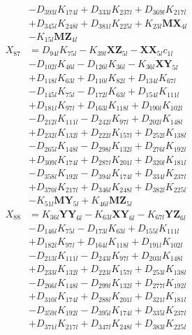 \begin{multicols}{2}
\begin{align}
&- D_{393l}K_{174l} + D_{333l}K_{237l} + D_{369l}K_{217l}  \nonumber \\
&+ D_{345l}K_{248l} + D_{381l}K_{225l} + K_{23l}\mathbf{MX}_{4l}  \nonumber \\
&- K_{15l}\mathbf{MZ}_{4l} \nonumber \\
X_{87} &= D_{94l}K_{75l} - K_{39l}\mathbf{XZ}_{5l} - \mathbf{XX}_{5l}c_{1l}  \nonumber \\
&- D_{102l}K_{46l} - D_{126l}K_{36l} - K_{36l}\mathbf{XY}_{5l}  \nonumber \\
&+ D_{118l}K_{63l} + D_{110l}K_{82l} + D_{134l}K_{67l}  \nonumber \\
&- D_{145l}K_{75l} - D_{172l}K_{63l} + D_{154l}K_{111l}  \nonumber \\
&+ D_{181l}K_{97l} + D_{163l}K_{118l} + D_{190l}K_{102l}  \nonumber \\
&- D_{212l}K_{111l} - D_{242l}K_{97l} + D_{202l}K_{148l}  \nonumber \\
&+ D_{232l}K_{132l} + D_{222l}K_{157l} + D_{252l}K_{138l}  \nonumber \\
&- D_{265l}K_{148l} - D_{298l}K_{132l} + D_{276l}K_{192l}  \nonumber \\
&+ D_{309l}K_{174l} + D_{287l}K_{201l} + D_{320l}K_{181l}  \nonumber \\
&- D_{358l}K_{192l} - D_{394l}K_{174l} + D_{334l}K_{237l}  \nonumber \\
&+ D_{370l}K_{217l} + D_{346l}K_{248l} + D_{382l}K_{225l}  \nonumber \\
&- K_{51l}\mathbf{MY}_{5l} + K_{46l}\mathbf{MZ}_{5l} \nonumber \\
X_{88} &= K_{36l}\mathbf{YY}_{6l} - K_{63l}\mathbf{XY}_{6l} - K_{67l}\mathbf{YZ}_{6l}  \nonumber \\
&- D_{146l}K_{75l} - D_{173l}K_{63l} + D_{155l}K_{111l}  \nonumber \\
&+ D_{182l}K_{97l} + D_{164l}K_{118l} + D_{191l}K_{102l}  \nonumber \\
&- D_{213l}K_{111l} - D_{243l}K_{97l} + D_{203l}K_{148l}  \nonumber \\
&+ D_{233l}K_{132l} + D_{223l}K_{157l} + D_{253l}K_{138l}  \nonumber \\
&- D_{266l}K_{148l} - D_{299l}K_{132l} + D_{277l}K_{192l}  \nonumber \\
&+ D_{310l}K_{174l} + D_{288l}K_{201l} + D_{321l}K_{181l}  \nonumber \\
&- D_{359l}K_{192l} - D_{395l}K_{174l} + D_{335l}K_{237l}  \nonumber \\
&+ D_{371l}K_{217l} + D_{347l}K_{248l} + D_{383l}K_{225l}  \nonumber \\

\end{align}
\end{multicols}
